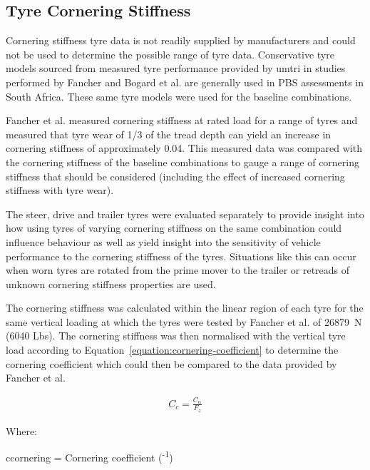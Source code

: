 \subsection{Tyre Cornering Stiffness}\label{section:pr-tyre-cornering-stiffness}

Cornering stiffness tyre data is not readily supplied by manufacturers and could not be used to determine the possible range of tyre data. Conservative tyre models sourced from measured tyre performance provided by \gls{umtri} in studies performed by Fancher \cite{Fancher1981} and Bogard et al. \cite{Bogard1991} are generally used in PBS assessments in South Africa. These same tyre models were used for the baseline combinations.

Fancher et al. \cite{Fancher1986} measured cornering stiffness at rated load for a range of tyres and measured that tyre wear of 1/3 of the tread depth can yield an increase in cornering stiffness of approximately 0.04. This measured data was compared with the cornering stiffness of the baseline combinations to gauge a range of cornering stiffness that should be considered (including the effect of increased cornering stiffness with tyre wear).

The steer, drive and trailer tyres were evaluated separately to provide insight into how using tyres of varying cornering stiffness on the same combination could influence behaviour as well as yield insight into the sensitivity of vehicle performance to the cornering stiffness of the tyres. Situations like this can occur when worn tyres are rotated from the prime mover to the trailer or retreads of unknown cornering stiffness properties are used.

The cornering stiffness was calculated within the linear region of each tyre for the same vertical loading at which the tyres were tested by Fancher et al. of 26879~N (6040 Lbs). The cornering stiffness was then normalised with the vertical tyre load according to Equation~\ref{equation:cornering-coefficient} to determine the cornering coefficient which could then be compared to the data provided by Fancher et al.

\begin{align}
	\label{equation:cornering-coefficient}
	C_{c} = \frac{C_{\alpha{}}}{F_z}
\end{align}

Where:

\gls{ccornering} = Cornering coefficient (\degree{}\textsuperscript{-1})

